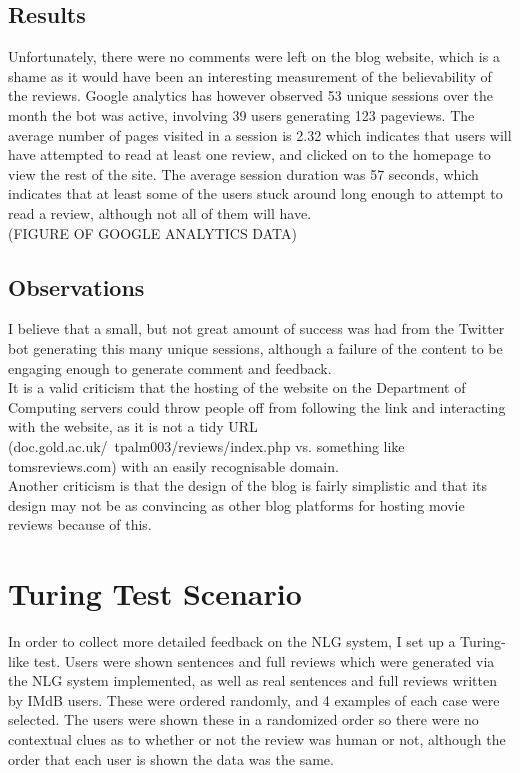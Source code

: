 \subsection{Results}
Unfortunately, there were no comments were left on the blog website, which is a shame as it would have been an interesting measurement of the believability of the reviews. Google analytics has however observed 53 unique sessions over the month the bot was active, involving 39 users generating 123 pageviews. The average number of pages visited in a session is 2.32 which indicates that users will have attempted to read at least one review, and clicked on to the homepage to view the rest of the site. The average session duration was 57 seconds, which indicates that at least some of the users stuck around long enough to attempt to read a review, although not all of them will have.\\

(FIGURE OF GOOGLE ANALYTICS DATA)
\subsection{Observations}
I believe that a small, but not great amount of success was had from the Twitter bot generating this many unique sessions, although a failure of the content to be engaging enough to generate comment and feedback.\\
It is a valid criticism that the hosting of the website on the Department of Computing servers could throw people off from following the link and interacting with the website, as it is not a tidy URL (doc.gold.ac.uk/~tpalm003/reviews/index.php vs. something like tomsreviews.com) with an easily recognisable domain.\\
Another criticism is that the design of the blog is fairly simplistic and that its design may not be as convincing as other blog platforms for hosting movie reviews because of this.\\


\section{Turing Test Scenario}
In order to collect more detailed feedback on the NLG system, I set up a Turing-like test. Users were shown sentences and full reviews which were generated via the NLG system implemented, as well as real sentences and full reviews written by IMdB users. These were ordered randomly, and 4 examples of each case were selected. The users were shown these in a randomized order so there were no contextual clues as to whether or not the review was human or not, although the order that each user is shown the data was the same.

